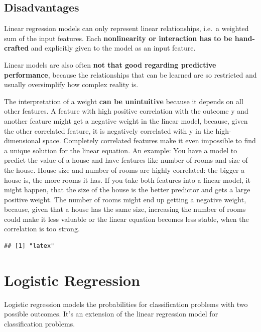 \documentclass[
  11pt,
]{scrbook}
\begin{document}
\hypertarget{disadvantages}{%
\subsection{Disadvantages}\label{disadvantages}}

Linear regression models can only represent linear relationships, i.e.~a weighted sum of the input features.
Each \textbf{nonlinearity or interaction has to be hand-crafted} and explicitly given to the model as an input feature.

Linear models are also often \textbf{not that good regarding predictive performance}, because the relationships that can be learned are so restricted and usually oversimplify how complex reality is.

The interpretation of a weight \textbf{can be unintuitive} because it depends on all other features.
A feature with high positive correlation with the outcome y and another feature might get a negative weight in the linear model, because, given the other correlated feature, it is negatively correlated with y in the high-dimensional space.
Completely correlated features make it even impossible to find a unique solution for the linear equation.
An example:
You have a model to predict the value of a house and have features like number of rooms and size of the house.
House size and number of rooms are highly correlated: the bigger a house is, the more rooms it has.
If you take both features into a linear model, it might happen, that the size of the house is the better predictor and gets a large positive weight.
The number of rooms might end up getting a negative weight, because, given that a house has the same size, increasing the number of rooms could make it less valuable or the linear equation becomes less stable, when the correlation is too strong.

\begin{verbatim}
## [1] "latex"
\end{verbatim}

\newpage

\hypertarget{logistic}{%
\section{Logistic Regression}\label{logistic}}

Logistic regression models the probabilities for classification problems with two possible outcomes.
It's an extension of the linear regression model for classification problems.
\end{document}
